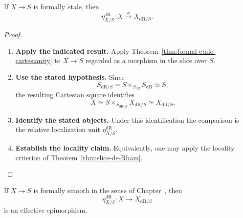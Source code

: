 \begin{theorem}
\label{thm:formal-etale-de-Rham}
If \(X\to S\) is formally \(\acute{e}\)tale, then
\[
  \eta_{X/S}^{\mathrm{dR}}:X\xrightarrow{\simeq}X_{\mathrm{dR}/S}.
\]
\end{theorem}

\begin{proof}
\leavevmode
\begin{enumerate}[label=\textup{(\arabic*)}]
    \item \textbf{Apply the indicated result.}
    Apply Theorem~\ref{thm:formal-etale-cartesianity} to
    \(X\to S\) regarded as a morphism in the slice over \(S\).
    \item \textbf{Use the stated hypothesis.}
    Since
    \[
    S_{\mathrm{dR}/S}
    =
    S\times_{S_{\mathrm{dR}}}S_{\mathrm{dR}}
    \simeq S,
    \]
    the resulting Cartesian square identifies
    \[
    X
    \simeq
    S\times_{S_{\mathrm{dR}/S}}X_{\mathrm{dR}/S}
    \simeq
    X_{\mathrm{dR}/S}.
    \]
    \item \textbf{Identify the stated objects.}
    Under this identification the comparison is the relative localization unit
    \(\eta_{X/S}^{\mathrm{dR}}\).
    \item \textbf{Establish the locality claim.}
    Equivalently, one may apply the locality criterion of
    Theorem~\ref{thm:slice-de-Rham}.
\end{enumerate}
\end{proof}

\begin{theorem}
\label{thm:formal-smooth-effectivity}
If \(X\to S\) is formally smooth in the sense of
Chapter~, then
\[
  \eta_{X/S}^{\mathrm{dR}}:X\longrightarrow X_{\mathrm{dR}/S}
\]
is an effective epimorphism.
\end{theorem}

